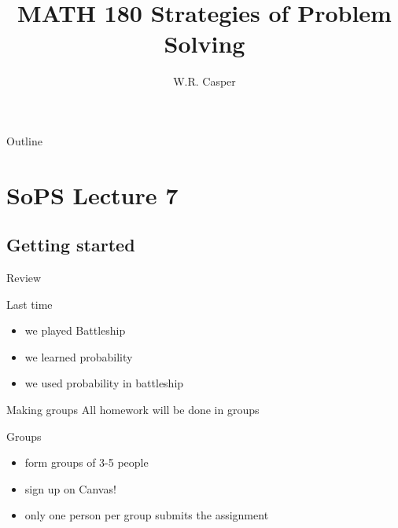 \documentclass{beamer}
\title{MATH 180 Strategies of Problem Solving}
\subtitle
{} %
\author[W.R. Casper] %
{W.R. Casper}
\institute[California State University Fullerton] %
{
  Department of Mathematics\\
  California State University Fullerton}
\begin{document}
\begin{frame}
  \titlepage
\end{frame}

\begin{frame}{Outline}
  \tableofcontents
\end{frame}



\section{SoPS Lecture 7}
\subsection{Getting started}


\begin{frame}{Review}
  \begin{block}{Last time}
    \begin{itemize}
\pause
      \item we played Battleship
\pause
      \item we learned probability
\pause
      \item we used probability in battleship
    \end{itemize}
  \end{block}
\end{frame}

\begin{frame}{Making groups}
  All homework will be done in groups
  \begin{block}{Groups}
    \begin{itemize}
\pause
      \item form groups of 3-5 people
\pause
      \item sign up on Canvas!
\pause
      \item only one person per group submits the assignment
    \end{itemize}
  \end{block}
\end{frame}
\end{document}
